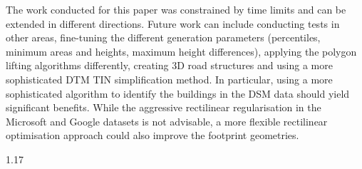 \documentclass{isprs} %
\begin{document}
The work conducted for this paper was constrained by time limits and can be extended in different directions.
Future work can include conducting tests in other areas, fine-tuning the different generation parameters (percentiles, minimum areas and heights, maximum height differences), applying the polygon lifting algorithms differently, creating 3D road structures and using a more sophisticated DTM TIN simplification method.
In particular, using a more sophisticated algorithm to identify the buildings in the DSM data should yield significant benefits.
While the aggressive rectilinear regularisation in the Microsoft and Google datasets is not advisable, a more flexible rectilinear optimisation approach could also improve the footprint geometries.

{
	\begin{spacing}{1.17}
		\normalsize
	\end{spacing}
}
\end{document}
